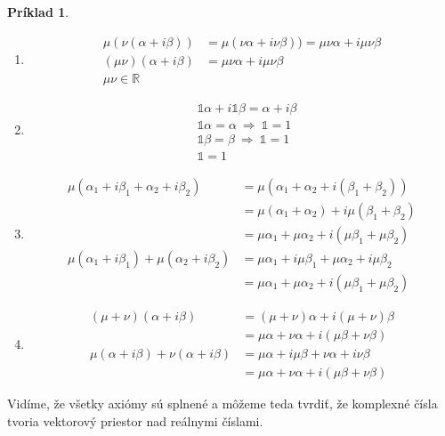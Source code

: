 \documentclass[a4paper, 10pt, ]{article}
\theoremstyle{definition}
\newtheorem{example}{Príklad}[section]
\begin{document}
\begin{example}
\begin{enumerate}
        \item
        \begin{align*}
            \mu (\nu (\alpha + i \beta)) &= \mu (\nu \alpha + i \nu \beta)) = \mu \nu \alpha + i \mu \nu \beta \\
            (\mu \nu) (\alpha + i \beta) &= \mu \nu \alpha + i \mu \nu \beta \\
            \mu \nu \in \mathbb{R}
        \end{align*}

        \item
        \begin{align*}
            &\mathbb{1} \alpha + i \mathbb{1} \beta = \alpha + i \beta \\
            &\mathbb{1} \alpha = \alpha \ \Longrightarrow \ \mathbb{1} = 1 \\
            &\mathbb{1} \beta = \beta \ \Longrightarrow \ \mathbb{1} = 1 \\
            &\mathbb{1} = 1 
        \end{align*}

        \item
        \begin{align*}
            \mu (\alpha_1 + i \beta_1 + \alpha_2 + i\beta_2) &= 
            \mu (\alpha_1 + \alpha_2 + i (\beta_1 + \beta_2)) \\ &= 
            \mu(\alpha_1 + \alpha_2) + i \mu (\beta_1 + \beta_2) \\ & = 
            \mu \alpha_1 + \mu \alpha_2 + i (\mu \beta_1 + \mu \beta_2) \\ 
            \mu (\alpha_1 + i \beta_1) + \mu (\alpha_2 + i \beta_2) &= 
            \mu \alpha_1 + i \mu \beta_1 + \mu \alpha_2 + i \mu \beta_2 \\ &=
            \mu \alpha_1 + \mu \alpha_2 + i (\mu \beta_1 + \mu \beta_2)  
        \end{align*}

        \item
        \begin{align*}
            (\mu + \nu) (\alpha + i \beta) &= 
            (\mu + \nu) \alpha + i (\mu + \nu) \beta \\ &=
            \mu \alpha + \nu \alpha + i (\mu \beta + \nu \beta) \\
            \mu (\alpha + i \beta) + \nu (\alpha + i \beta) &= 
            \mu \alpha + i \mu \beta + \nu \alpha + i \nu \beta \\ &=
            \mu \alpha + \nu \alpha + i (\mu \beta + \nu \beta)  
        \end{align*}
    \end{enumerate}
    Vidíme, že všetky axiómy sú splnené a môžeme teda tvrdiť, že komplexné čísla tvoria vektorový priestor nad reálnymi číslami.
\end{example}
\end{document}
